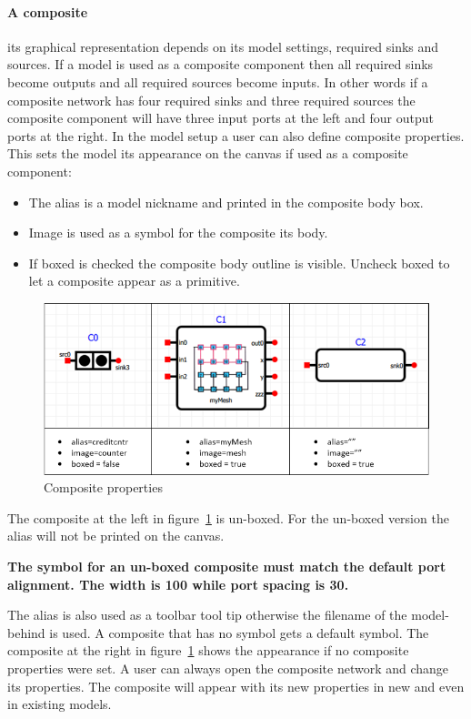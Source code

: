 \paragraph{A composite} \label{sec:composite} its graphical representation
depends on its model settings, required sinks and sources. If a model is used as
a composite component then all required sinks become outputs and all required
sources become inputs. In other words if a composite network has four required
sinks and three required sources the composite component will have three input
ports at the left and four output ports at the right. In the model setup a user
can also define composite properties. This sets the model its appearance on the
canvas if used as a composite component:
\begin{itemize}
\item The alias is a model nickname and printed in the composite body box.
\item Image is used as a symbol for the composite its body. 
\item If boxed is checked the composite body outline is visible.
Uncheck boxed to let a composite appear as a primitive.
\end{itemize}

\begin{figure}[here]
\begin{center}	
	\includegraphics[width=.70\linewidth]{pictures/composites}
	\caption{Composite properties}
	\label{fig:composites}
\end{center}
\end{figure}

The composite at the left in figure~\ref{fig:composites} is un-boxed. For the un-boxed
version the alias will not be printed on the canvas.\\

\begin{tcolorbox}[colback=white]
\textbf{
The symbol for an un-boxed composite must match the default port alignment.
The width is 100 while port spacing is 30.
}
\end{tcolorbox}
\vspace{0.1cm}
The alias is also used as a toolbar tool tip otherwise the filename of the
model-behind is used. A composite that has no symbol gets a default symbol. The
composite at the right in figure~\ref{fig:composites} shows the appearance if no
composite properties were set. A user can always open the composite network and
change its properties. The composite will appear with its new properties in new
and even in existing models.

